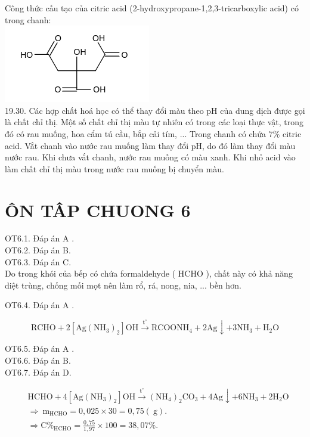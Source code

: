 \documentclass[10pt]{article}
\begin{document}
Công thức cấu tạo của citric acid (2-hydroxypropane-1,2,3-tricarboxylic acid) có trong chanh:\\
\includegraphics{smile-68eb80b650b30f622599139d0e7fa2ea14683f35}\\
19.30. Các hợp chất hoá học có thể thay đổi màu theo pH của dung dịch được gọi là chất chỉ thị. Một số chất chỉ thị màu tự nhiên có trong các loại thực vật, trong đó có rau muống, hoa cẩm tú cầu, bắp cải tím, ... Trong chanh có chứa $7 \%$ citric acid. Vắt chanh vào nước rau muống làm thay đổi pH, do đó làm thay đổi màu nước rau. Khi chưa vắt chanh, nước rau muống có màu xanh. Khi nhỏ acid vào làm chất chỉ thị màu trong nước rau muống bị chuyển màu.

\section*{ÔN TÂP CHUONG 6}
OT6.1. Đáp án A .\\
OT6.2. Đáp án B.\\
OT6.3. Đáp án C.\\
Do trong khói của bếp có chứa formaldehyde ( HCHO ), chất này có khả năng diệt trùng, chống mối mọt nên làm rổ, rá, nong, nia, ... bền hơn.

OT6.4. Đáp án A .

$$
\mathrm{RCHO}+2\left[\mathrm{Ag}\left(\mathrm{NH}_{3}\right)_{2}\right] \mathrm{OH} \xrightarrow{\mathrm{t}^{\circ}} \mathrm{RCOONH}_{4}+2 \mathrm{Ag} \downarrow+3 \mathrm{NH}_{3}+\mathrm{H}_{2} \mathrm{O}
$$

OT6.5. Đáp án A .\\
OT6.6. Đáp án B.\\
OT6.7. Đáp án D.

$$
\begin{aligned}
& \mathrm{HCHO}+4\left[\mathrm{Ag}\left(\mathrm{NH}_{3}\right)_{2}\right] \mathrm{OH} \xrightarrow{\mathrm{t}^{\circ}}\left(\mathrm{NH}_{4}\right)_{2} \mathrm{CO}_{3}+4 \mathrm{Ag} \downarrow+6 \mathrm{NH}_{3}+2 \mathrm{H}_{2} \mathrm{O} \\
& \Rightarrow \mathrm{~m}_{\mathrm{HCHO}}=0,025 \times 30=0,75(\mathrm{~g}) . \\
& \Rightarrow \mathrm{C} \%_{\mathrm{HCHO}}=\frac{0,75}{1,97} \times 100=38,07 \% .
\end{aligned}
$$
\end{document}
